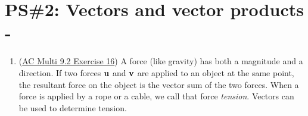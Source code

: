 


%


\allowdisplaybreaks
\section{PS\#2: Vectors and vector products -  }

\begin{enumerate}[leftmargin=0pt]
    \item 
    \begin{minipage}[t]{0.5\linewidth}
    (\href{https://activecalculus.org/multi/S-9-2-Vectors.html#Ez-9-2-4}{AC Multi 9.2 Exercise 16})
    A force (like gravity) has both a magnitude and a direction. If two forces $\mathbf{u}$ and $\mathbf{v}$ are applied to an object at the same point, the resultant force on the object is the vector sum of the two forces. When a force is applied by a rope or a cable, we call that force \textit{tension}. Vectors can be used to determine tension.
    

\end{minipage}
\end{enumerate}

